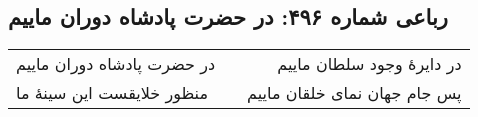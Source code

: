 \begin{center}
\section*{رباعی شماره ۴۹۶: در حضرت پادشاه دوران ماییم}
\label{sec:sh496}
\begin{longtable}{l p{0.5cm} r}
در حضرت پادشاه دوران ماییم
&&
در دایرهٔ وجود سلطان ماییم
\\
منظور خلایقست این سینهٔ ما
&&
پس جام جهان نمای خلقان ماییم
\\
\end{longtable}
\end{center}
